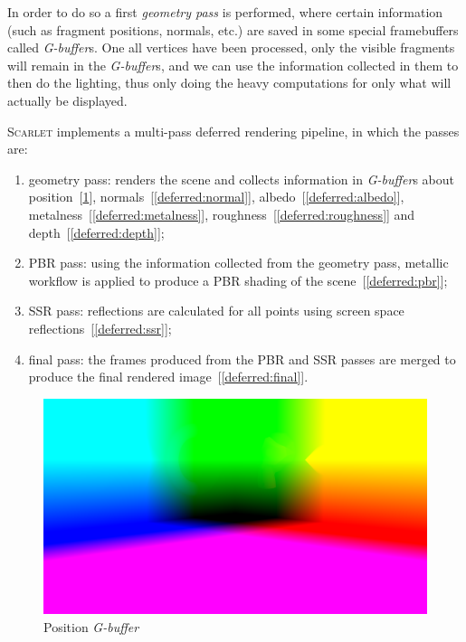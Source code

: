\documentclass[11pt,a4paper]{report}
\begin{document}
In order to do so a first \textit{geometry pass} is performed, where certain information (such as fragment positions, normals, etc.) are saved in some special framebuffers called \textit{G-buffer}s. One all vertices have been processed, only the visible fragments will remain in the \textit{G-buffer}s, and we can use the information collected in them to then do the lighting, thus only doing the heavy computations for only what will actually be displayed.

\textsc{Scarlet} implements a multi-pass deferred rendering pipeline, in which the passes are:
\begin{enumerate}
	\item geometry pass: renders the scene and collects information in \textit{G-buffer}s about position~[\ref{deferred:position}], normals~[\ref{deferred:normal}], albedo~[\ref{deferred:albedo}], metalness~[\ref{deferred:metalness}], roughness~[\ref{deferred:roughness}] and depth~[\ref{deferred:depth}];
	\item PBR pass: using the information collected from the geometry pass, metallic workflow is applied to produce a PBR shading of the scene~[\ref{deferred:pbr}];
	\item SSR pass: reflections are calculated for all points using screen space reflections~[\ref{deferred:ssr}];
	\item final pass: the frames produced from the PBR and SSR passes are merged to produce the final rendered image~[\ref{deferred:final}].
\end{enumerate}

\begin{figure}[htp]
	\centering
	\includegraphics[width=\textwidth]{deferred/00position.png}
	\caption{Position \textit{G-buffer}}
	\label{deferred:position}
\end{figure}
\end{document}
